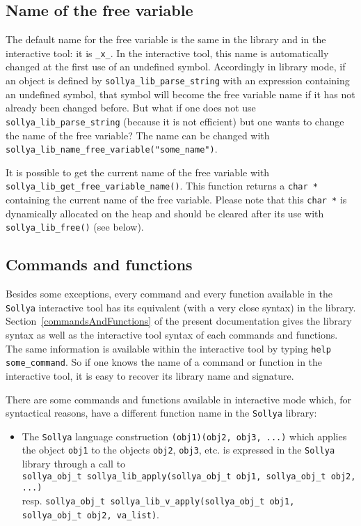 \documentclass[a4paper]{article}
\newcommand{\sollya}{\texttt{Sollya}\xspace}
\begin{document}
\subsection{Name of the free variable}
The default name for the free variable is the same in the library and in the interactive tool: it is \texttt{\_x\_}. In the interactive tool, this name is automatically changed at the first use of an undefined symbol. Accordingly in library mode, if an object is defined by \texttt{sollya\_lib\_parse\_string} with an expression containing an undefined symbol, that symbol will become the free variable name if it has not already been changed before. But what if one does not use \texttt{sollya\_lib\_parse\_string} (because it is not efficient) but one wants to change the name of the free variable? The name can be changed with \texttt{sollya\_lib\_name\_free\_variable("some\_name")}.

It is possible to get the current name of the free variable with \texttt{sollya\_lib\_get\_free\_variable\_name()}. This function returns a \texttt{char *} containing the current name of the free variable. Please note that this \texttt{char *} is dynamically allocated on the heap and should be cleared after its use with \texttt{sollya\_lib\_free()} (see below).

\subsection{Commands and functions}
\label{library_commands_and_functions}
Besides some exceptions, every command and every function available in the \sollya interactive tool has its equivalent (with a very close syntax) in the library. Section~\ref{commandsAndFunctions} of the present documentation gives the library syntax as well as the interactive tool syntax of each commands and functions. The same information is available within the interactive tool by typing \texttt{help some\_command}. So if one knows the name of a command or function in the interactive tool, it is easy to recover its library name and signature.

There are some commands and functions available in interactive mode which, for syntactical reasons, have a different function name in the \sollya library:
\begin{itemize}
  \item The \sollya language construction \texttt{(obj1)(obj2, obj3, ...)} which applies the object \texttt{obj1} to the objects \texttt{obj2}, \texttt{obj3}, etc. is expressed in the \sollya library through a call to\\
 \texttt{sollya\_obj\_t sollya\_lib\_apply(sollya\_obj\_t obj1, sollya\_obj\_t obj2, ...)}\\
 resp. \texttt{sollya\_obj\_t sollya\_lib\_v\_apply(sollya\_obj\_t obj1, sollya\_obj\_t obj2, va\_list)}.
\end{itemize}
\end{document}
